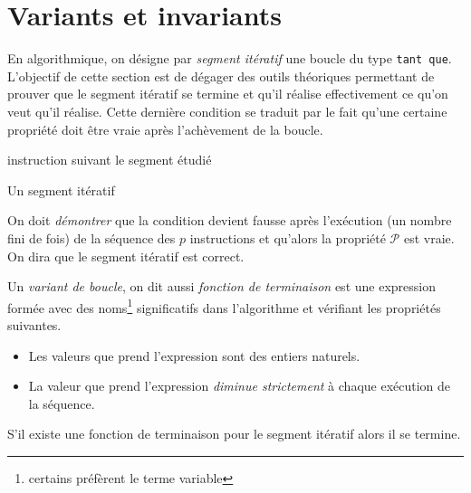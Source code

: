 

\section{Variants et invariants}
En algorithmique, on désigne par \emph{segment itératif} une boucle du type \og\verb|tant que|\fg.\newline
L'objectif de cette section est de dégager des outils théoriques permettant de prouver que le segment itératif se termine et qu'il réalise effectivement ce qu'on veut qu'il réalise. Cette dernière condition se traduit par le fait qu'une certaine propriété doit être vraie après l'achèvement de la boucle.
\begin{algorithm}
  instruction suivant le segment étudié\;
  \caption{Un segment itératif}
  \label{corsegit_1}
\end{algorithm}
On doit \emph{démontrer} que la condition devient fausse après l'exécution (un nombre fini de fois) de la séquence des $p$ instructions et qu'alors la propriété $\mathcal{P}$ est vraie. On dira que le segment itératif est correct.
\begin{defi}
Un \emph{variant de boucle}, on dit aussi \emph{fonction de terminaison} est une expression formée avec des noms\footnote{certains préfèrent le terme \og variable\fg} significatifs dans l'algorithme et vérifiant les propriétés suivantes.
\begin{itemize}                                                                                                                                                                                                                                               \item Les valeurs que prend l'expression sont des entiers naturels.
\item La valeur que prend l'expression \emph{diminue strictement} à chaque exécution de la séquence.                                                                                                                                                                                                                             \end{itemize}
\end{defi}
\begin{prop}
  S'il existe une fonction de terminaison pour le segment itératif alors il se termine.
\end{prop}
